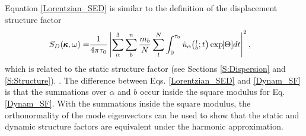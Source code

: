 Equation \eqref{Lorentzian_SED} is similar to the definition of 
the displacement structure factor
\cite{volz_molecular-dynamics_2000,horbach_high_2001,
martin-mayor_dynamical_2001,christie_vibrational_2007,
beltukov_ioffe-regel_2013}
\begin{equation}\label{Dynam_SF}
\begin{split}
S_{D}(\pmb{\kappa},\omega) = & \frac{1}{4\pi\tau_0} \left| \sum_\alpha^3 
\sum_b^n \frac{m_b}{N}
 \sum_l^N  \int_{0}^{\tau_0} \dot{u}_{\alpha}\mspace{-4.0mu}\left(\mspace{-8.0mu} \begin{smallmatrix}&l \\&b\end{smallmatrix}\mspace{-2.0mu};t\right) \exp\mspace{-5.0mu}\left[\Theta\right]\mspace{-3.0mu} dt 
\right|^2,
\end{split}
\end{equation}
which is related to the static structure factor 
\cite{biswas_vibrational_1988,feldman_thermal_1993,
allen_diffusons_1999,feldman_numerical_1999,
taraskin_determination_1999,taraskin_propagation_2000,
feldman_calculations_2002,ciliberti_brillouin_2003,
shintani_universal_2008,wyart_scaling_2010,
beltukov_ioffe-regel_2013,larkin_predicting_2013,
marruzzo_heterogeneous_2013} (see Sections \ref{S:Dispersion} 
and \ref{S:Structure}). 
\cite{beltukov_ioffe-regel_2013}. The difference between Eqs. 
\eqref{Lorentzian_SED} and \eqref{Dynam_SF} is that the 
summations over $\alpha$ and $b$ occur inside the square modulus 
for Eq. \eqref{Dynam_SF}. With the summations inside the 
square modulus, the orthonormality of the mode eigenvectors 
can be used to show that the static and dynamic 
structure factors are equivalent under the harmonic approximation.
\cite{beltukov_ioffe-regel_2013} 



